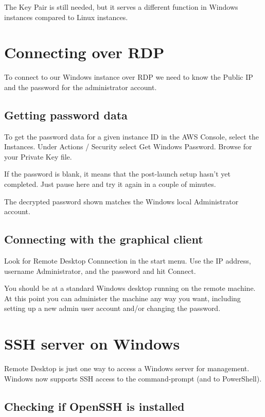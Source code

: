 The Key Pair is still needed, but it serves a different function in
Windows instances compared to Linux instances.


\section{Connecting over RDP}\label{connecting-over-rdp}

To connect to our Windows instance over RDP we need to know the Public
IP and the password for the administrator account.

\subsection{Getting password data}\label{getting-password-data}

To get the password data for a given instance ID in the AWS Console, select the Instances.
Under Actions / Security select Get Windows Password.
Browse for your Private Key file.

If the password is blank, it means that the post-launch setup hasn't yet
completed. Just pause here and try it again in a couple of minutes.

The decrypted password shown matches the Windows local Administrator
account.

\subsection{Connecting with the graphical client}
\label{sec:connecting-with-the-graphical-client}

Look for Remote Desktop Connnection in the start menu. Use the IP
address, username Administrator, and the password and hit Connect.

You should be at a standard Windows desktop running on the remote
machine. At this point you can administer the machine any way you want,
including setting up a new admin user account and/or changing the
password.

\section{SSH server on Windows}\label{ssh-server-on-windows}

Remote Desktop is just one way to access a Windows server for management.
Windows now supports SSH access to the command-prompt (and to PowerShell).

\subsection{Checking if OpenSSH is installed}
\label{checking-if-openssh-is-installed}

